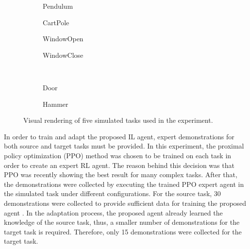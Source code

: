 \begin{figure}[H]
  \centering
  \begin{subfigure}[b]{0.2\textwidth}
    \centering
    \caption{Pendulum}
  \end{subfigure}
  \hfill
  \begin{subfigure}[b]{0.2\textwidth}
    \centering
    \caption{CartPole}
  \end{subfigure}
  \hfill
  \begin{subfigure}[b]{0.25\textwidth}
    \centering
    \caption{WindowOpen}
  \end{subfigure}
  \hfill
  \begin{subfigure}[b]{0.25\textwidth}
    \centering
    \caption{WindowClose}
  \end{subfigure}\\
  \par\bigskip
  \begin{subfigure}[b]{0.2\textwidth}
    \centering
    \caption{Door}
  \end{subfigure}
  \hspace{4em}
  \begin{subfigure}[b]{0.2\textwidth}
    \centering
    \caption{Hammer}
  \end{subfigure}
  \caption{Visual rendering of five simulated tasks used in the experiment.\label{ch:DTAIL:fig:Tasks}}
\end{figure}
\unskip




In order to train and adapt the proposed IL agent,
expert demonstrations for both source and target tasks must be provided.
In this experiment,
the proximal policy optimization (PPO) method was chosen to be trained on each task in order to create an expert RL agent.
The reason behind this decision was that PPO was recently showing the best result for many complex tasks.
After that,
the demonstrations were collected by executing the trained PPO expert agent in the simulated task under different configurations.
For the source task, 30 demonstrations were collected to provide sufficient data for training the proposed agent \cite{IL_Model_GAIL}.
In the adaptation process, the proposed agent already learned the knowledge of the source task, thus, a smaller number of demonstrations for the target task is required.
Therefore, only 15 demonstrations were collected for the target task.


